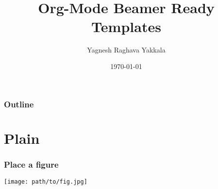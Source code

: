 \documentclass[10pt]{beamer}
\title{Org-Mode Beamer Ready Templates}
\author{Yagnesh Raghava Yakkala}
\date{\today}
\begin{document}
\maketitle

\begin{frame}
\frametitle{Outline}
\setcounter{tocdepth}{3}
\tableofcontents
\end{frame}

\section{Plain}
\label{sec-1}
\begin{frame}
\frametitle{Place a figure}
\label{sec-1-1}

\centering
\texttt{[image: path/to/fig.jpg]}
\end{frame}
\end{document}
